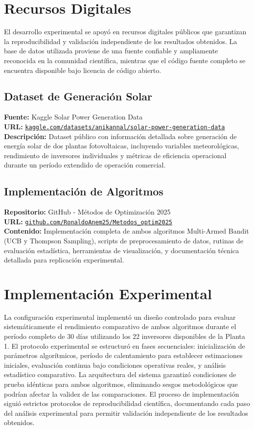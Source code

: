 \documentclass[conference]{IEEEtran}
\begin{document}
\section{Recursos Digitales}

El desarrollo experimental se apoyó en recursos digitales públicos que garantizan la reproducibilidad y validación independiente de los resultados obtenidos. La base de datos utilizada proviene de una fuente confiable y ampliamente reconocida en la comunidad científica, mientras que el código fuente completo se encuentra disponible bajo licencia de código abierto.

\subsection{Dataset de Generación Solar}
\textbf{Fuente:} Kaggle Solar Power Generation Data\\
\textbf{URL:} \href{https://acortar.link/rS9PxU}{\texttt{kaggle.com/datasets/anikannal/solar-power-generation-data}}\\
\textbf{Descripción:} Dataset público con información detallada sobre generación de energía solar de dos plantas fotovoltaicas, incluyendo variables meteorológicas, rendimiento de inversores individuales y métricas de eficiencia operacional durante un período extendido de operación comercial.

\subsection{Implementación de Algoritmos}
\textbf{Repositorio:} GitHub - Métodos de Optimización 2025\\
\textbf{URL:} \href{https://acortar.link/HgyuN6}{\texttt{github.com/RonaldoAnem25/Metodos\_optim2025}}\\
\textbf{Contenido:} Implementación completa de ambos algoritmos Multi-Armed Bandit (UCB y Thompson Sampling), scripts de preprocesamiento de datos, rutinas de evaluación estadística, herramientas de visualización, y documentación técnica detallada para replicación experimental.

\section{Implementación Experimental}

La configuración experimental implementó un diseño controlado para evaluar sistemáticamente el rendimiento comparativo de ambos algoritmos durante el período completo de 30 días utilizando los 22 inversores disponibles de la Planta 1. El protocolo experimental se estructuró en fases secuenciales: inicialización de parámetros algorítmicos, período de calentamiento para establecer estimaciones iniciales, evaluación continua bajo condiciones operativas reales, y análisis estadístico comparativo. La arquitectura del sistema garantizó condiciones de prueba idénticas para ambos algoritmos, eliminando sesgos metodológicos que podrían afectar la validez de las comparaciones. El proceso de implementación siguió estrictos protocolos de reproducibilidad científica, documentando cada paso del análisis experimental para permitir validación independiente de los resultados obtenidos.
\end{document}
